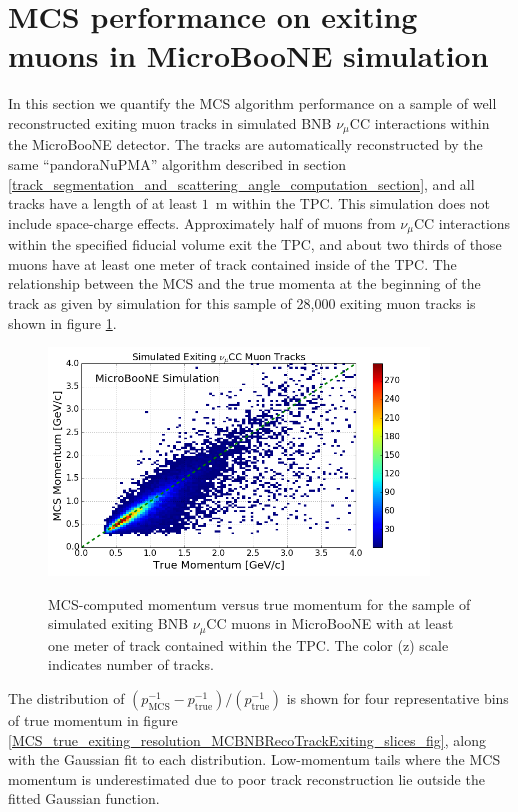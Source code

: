 \documentclass[a4paper,11pt]{article}
\begin{document}
\section{MCS performance on exiting muons in MicroBooNE simulation}
In this section we quantify the MCS algorithm performance on a sample of well reconstructed exiting muon tracks in simulated BNB $\nu_\mu$CC interactions within the MicroBooNE detector. The tracks are automatically reconstructed by the same ``pandoraNuPMA'' algorithm described in section \ref{track_segmentation_and_scattering_angle_computation_section}, and all tracks have a length of at least $1$~m within the TPC. This simulation does not include space-charge effects. Approximately half of muons from $\nu_\mu$CC interactions within the specified fiducial volume exit the TPC, and about two thirds of those muons have at least one meter of track contained inside of the TPC. The relationship between the MCS and the true momenta at the beginning of the track as given by simulation for this sample of 28,000 exiting muon tracks is shown in figure \ref{MCS_true_comparison_exiting_fig}.\\

\begin{figure}[ht!]
\centering
	\includegraphics[width=0.9\textwidth]{Figures/MCS_true_comparison_MCBNBRecoTrackExiting.png} \\
\caption{MCS-computed momentum versus true momentum for the sample of simulated exiting BNB $\nu_\mu$CC muons in MicroBooNE with at least one meter of track contained within the TPC. The color (z) scale indicates number of tracks.}\label{MCS_true_comparison_exiting_fig}
\end{figure}

The distribution of $(p_{\text{MCS}}^{-1} - p_{\text{true}}^{-1})/(p_{\text{true}}^{-1})$ is shown for four representative bins of true momentum in figure \ref{MCS_true_exiting_resolution_MCBNBRecoTrackExiting_slices_fig}, along with the Gaussian fit to each distribution. Low-momentum tails where the MCS momentum is underestimated due to poor track reconstruction lie outside the fitted Gaussian function.\\
\end{document}
